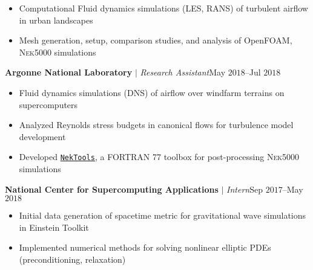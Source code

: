 \documentclass[10pt]{article}
\begin{document}
\begin{multicols}{2}
\vspace{-1.75em}
\begin{itemize}[label=-,leftmargin=1.0em]
    \setlength\itemsep{-0.25em}
    \item Computational Fluid dynamics simulations (LES, RANS) of turbulent airflow in urban landscapes
    \item Mesh generation, setup, comparison studies, and analysis of OpenFOAM, \textsc{Nek5000} simulations
\end{itemize}
\vspace{-2.0em}

\vspace{0.5em}
%
\textbf{Argonne National Laboratory} $|$ \textit{Research Assistant}\hfill May $2018$--Jul $2018$

\vspace{-1.75em}
\begin{itemize}[label=-,leftmargin=1.0em]
    \setlength\itemsep{-0.25em}
    \item Fluid dynamics simulations (DNS) of airflow over windfarm terrains on supercomputers
    \item Analyzed Reynolds stress budgets in canonical flows for turbulence model development
    \item Developed \href{https://github.com/vpuri3/NekTools}{\texttt{NekTools}}, a FORTRAN 77 toolbox for post-processing \textsc{Nek5000} simulations
\end{itemize}
\vspace{-2.0em}

\vspace{0.5em}
%
\textbf{National Center for Supercomputing Applications} $|$ \textit{Intern}\hfill Sep $2017$--May $2018$

\vspace{-1.75em}
\begin{itemize}[label=-,leftmargin=1.0em]
    \setlength\itemsep{-0.25em}
    \item Initial data generation of spacetime metric for gravitational wave simulations in Einstein Toolkit
    \item Implemented numerical methods for solving nonlinear elliptic PDEs (preconditioning, relaxation)
\end{itemize}
\vspace{-2.0em}


\end{multicols}
\end{document}
